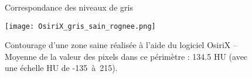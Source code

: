 \documentclass[main.tex]{subfiles}
\begin{document}
\begin{figure}
\centering

\caption{\label{fig:schema_correspondance_gris} Correspondance des niveaux de gris }
\end{figure}


\begin{figure}
\texttt{[image: OsiriX\_gris\_sain\_rognee.png]}
\caption{\label{fig:contourage_sain}Contourage d'une zone saine réalisée à l'aide du logiciel OsiriX -- Moyenne de la valeur des pixels dans ce périmètre : 134.5 HU (avec une échelle HU de \mbox{-135 à 215}).}
\end{figure}

\end{document}
